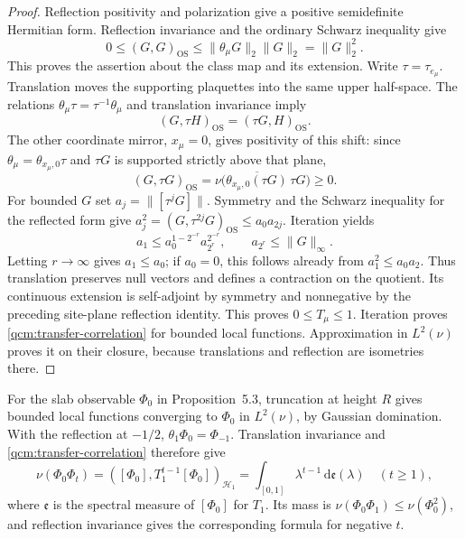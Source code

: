 \documentclass[11pt,letterpaper,reqno]{amsart}
\theoremstyle{definition}
\begin{document}
\begin{proof}
Reflection positivity and polarization give a positive semidefinite
Hermitian form. Reflection invariance and the ordinary Schwarz
inequality give
\[
 0\le (G,G)_{\mathrm{OS}}
 \le\|\theta_\mu G\|_2\|G\|_2=\|G\|_2^2.
\]
This proves the assertion about the class map and its extension.
Write $\tau=\tau_{e_\mu}$. Translation moves the supporting
plaquettes into the same upper half-space. The relations
$\theta_\mu\tau=\tau^{-1}\theta_\mu$ and translation invariance imply
\[
 (G,\tau H)_{\mathrm{OS}}=(\tau G,H)_{\mathrm{OS}}.
\]
The other coordinate mirror, $x_\mu=0$, gives positivity of this
shift: since $\theta_\mu=\theta_{x_\mu,0}\tau$ and $\tau G$ is
supported strictly above that plane,
\[
 (G,\tau G)_{\mathrm{OS}}
 =\nu\bigl(\overline{\theta_{x_\mu,0}(\tau G)}\,\tau G\bigr)\ge0.
\]
For bounded $G$ set $a_j=\|[\tau^jG]\|$. Symmetry and the
Schwarz inequality for the reflected form give
$a_j^2=(G,\tau^{2j}G)_{\mathrm{OS}}\le a_0a_{2j}$.
Iteration yields
\[
 a_1\le a_0^{1-2^{-r}}a_{2^r}^{2^{-r}},\qquad
 a_{2^r}\le\|G\|_\infty.
\]
Letting $r\to\infty$ gives $a_1\le a_0$; if $a_0=0$, this follows
already from $a_1^2\le a_0a_2$. Thus translation preserves null
vectors and defines a contraction on the quotient. Its continuous
extension is self-adjoint by symmetry and nonnegative by the preceding
site-plane reflection identity. This proves $0\le T_\mu\le1$.
Iteration proves \eqref{qcm:transfer-correlation} for bounded local
functions. Approximation in $L^2(\nu)$ proves it on their closure,
because translations and reflection are isometries there.
\end{proof}

For the slab observable $\Phi_0$ in Proposition~5.3, truncation at
height $R$ gives bounded local functions converging to $\Phi_0$ in
$L^2(\nu)$, by Gaussian domination. With the reflection at $-1/2$,
$\theta_1\Phi_0=\Phi_{-1}$. Translation invariance and
\eqref{qcm:transfer-correlation} therefore give
\[
 \nu(\Phi_0\Phi_t)
   =([\Phi_0],T_1^{t-1}[\Phi_0])_{\mathcal H_1}
   =\int_{[0,1]}\lambda^{t-1}\,\mathrm d\mathfrak e(\lambda)
       \quad(t\ge1),
\]
where $\mathfrak e$ is the spectral measure of $[\Phi_0]$ for $T_1$.
Its mass is $\nu(\Phi_0\Phi_1)\le\nu(\Phi_0^2)$, and reflection
invariance gives the corresponding formula for negative $t$.
\end{document}
